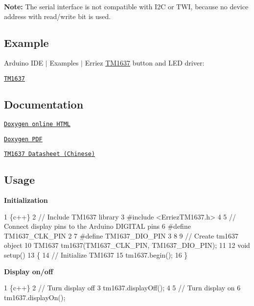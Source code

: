 {\bfseries Note\+:} The serial interface is not compatible with I2C or T\+WI, because no device address with read/write bit is used.

\subsection*{Example}

Arduino I\+DE $\vert$ Examples $\vert$ Erriez \hyperlink{class_t_m1637}{T\+M1637} button and L\+ED driver\+:

\href{https://github.com/Erriez/ErriezTM1637/blob/master/examples/TM1637/TM1637.ino}{\tt T\+M1637}

\subsection*{Documentation}


\begin{DoxyItemize}
\item \href{https://Erriez.github.io/ErriezTM1637}{\tt Doxygen online H\+T\+ML}
\item \href{https://github.com/Erriez/ErriezTM1637/raw/gh-pages/latex/ErriezTM1637.pdf}{\tt Doxygen P\+DF}
\item \href{https://github.com/Erriez/ErriezTM1637/blob/master/extras/TM1637_datasheet_chinese.pdf}{\tt T\+M1637 Datasheet (Chinese)}
\end{DoxyItemize}

\subsection*{Usage}

{\bfseries Initialization}


\begin{DoxyCode}
1 \{c++\}
2 // Include TM1637 library
3 #include <ErriezTM1637.h>
4 
5 // Connect display pins to the Arduino DIGITAL pins
6 #define TM1637\_CLK\_PIN   2
7 #define TM1637\_DIO\_PIN   3
8 
9 // Create tm1637 object
10 TM1637 tm1637(TM1637\_CLK\_PIN, TM1637\_DIO\_PIN);
11 
12 void setup()
13 \{
14     // Initialize TM1637
15     tm1637.begin();
16 \}
\end{DoxyCode}


{\bfseries Display on/off}


\begin{DoxyCode}
1 \{c++\}
2 // Turn display off
3 tm1637.displayOff();
4 
5 // Turn display on
6 tm1637.displayOn();
\end{DoxyCode}


